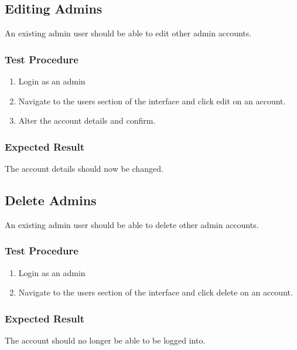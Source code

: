\documentclass[a4paper, draft]{article}
\begin{document}
\subsection{Editing Admins}
An existing admin user should be able to edit other admin accounts.

\subsubsection{Test Procedure}
\begin{enumerate}
    \item Login as an admin
    \item Navigate to the users section of the interface and click edit on an account.
    \item Alter the account details and confirm.
\end{enumerate}

\subsubsection{Expected Result}
The account details should now be changed.

\subsection{Delete Admins}
An existing admin user should be able to delete other admin accounts.

\subsubsection{Test Procedure}
\begin{enumerate}
    \item Login as an admin
    \item Navigate to the users section of the interface and click delete on an account.
\end{enumerate}

\subsubsection{Expected Result}
The account should no longer be able to be logged into.
\end{document}

